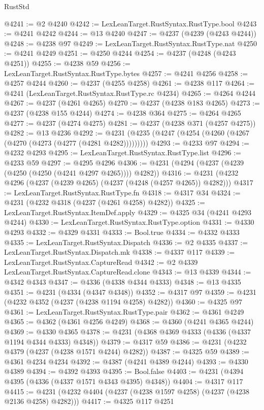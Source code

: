 \begin{lexlean}{RustStd}
\begin{coremodule}
@4241 := @2 @4240
@4242 := LexLeanTarget.RustSyntax.RustType.bool
@4243 := @4241 @4242
@4244 := @13 @4240
@4247 := @4237 (@4239 (@4243 @4244))
@4248 := @4238 @97
@4249 := LexLeanTarget.RustSyntax.RustType.nat
@4250 := @4241 @4249
@4251 := @4250 @4244
@4254 := @4237 (@4248 (@4243 @4251))
@4255 := @4238 @59
@4256 := LexLeanTarget.RustSyntax.RustType.bytes
@4257 := @4241 @4256
@4258 := @4257 @4244
@4260 := @4237 (@4255 @4258)
@4261 := @4238 @117
@4264 := @4241 (LexLeanTarget.RustSyntax.RustType.rc @4234)
@4265 := @4264 @4244
@4267 := @4237 (@4261 @4265)
@4270 := @4237 (@4238 @183 @4265)
@4273 := @4237 (@4238 @155 @4244)
@4274 := @4238 @364
@4275 := @4264 @4265
@4277 := @4237 (@4274 @4275)
@4281 := @4237 (@4238 @371 (@4257 @4275))
@4282 := @13 @4236
@4292 := @4231 (@4235 (@4247 (@4254 (@4260 (@4267 (@4270 (@4273 (@4277 (@4281 @4282)))))))))
@4293 := @4233 @97
@4294 := @4232 @4293
@4295 := LexLeanTarget.RustSyntax.RustType.list
@4296 := @4233 @59
@4297 := @4295 @4296
@4306 := @4231 (@4294 (@4237 (@4239 (@4250 (@4250 (@4241 @4297 @4265)))) @4282))
@4316 := @4231 (@4232 @4296 (@4237 (@4239 @4265) (@4237 (@4248 (@4257 @4265)) @4282)))
@4317 := LexLeanTarget.RustSyntax.RustType.fn
@4318 := @4317 @34
@4324 := @4231 (@4232 @4318 (@4237 (@4261 @4258) @4282))
@4325 := LexLeanTarget.RustSyntax.ItemDef.apply
@4329 := @4325 @34 (@4241 @4293 @4244)
@4330 := LexLeanTarget.RustSyntax.RustType.option
@4331 := @4330 @4293
@4332 := @4329 @4331
@4333 := Bool.true
@4334 := @4332 @4333
@4335 := LexLeanTarget.RustSyntax.Dispatch
@4336 := @2 @4335
@4337 := LexLeanTarget.RustSyntax.Dispatch.mk
@4338 := @4337 @117
@4339 := LexLeanTarget.RustSyntax.CaptureRead
@4342 := @2 @4339 LexLeanTarget.RustSyntax.CaptureRead.clone
@4343 := @13 @4339
@4344 := @4342 @4343
@4347 := @4336 (@4338 @4344 @4333)
@4348 := @13 @4335
@4351 := @4231 (@4334 (@4347 @4348))
@4352 := @4317 @97
@4359 := @4231 (@4232 @4352 (@4237 (@4238 @1194 @4258) @4282))
@4360 := @4325 @97
@4361 := LexLeanTarget.RustSyntax.RustType.pair
@4362 := @4361 @4249
@4365 := @4362 (@4361 @4256 @4249)
@4368 := @4360 (@4241 @4365 @4244)
@4369 := @4330 @4365
@4378 := @4231 (@4368 @4369 @4333 (@4336 (@4337 @1194 @4344 @4333) @4348))
@4379 := @4317 @59
@4386 := @4231 (@4232 @4379 (@4237 (@4238 @1571 @4244) @4282))
@4387 := @4325 @59
@4389 := @4361 @4234 @4234
@4392 := @4387 (@4241 @4389 @4244)
@4393 := @4330 @4389
@4394 := @4392 @4393
@4395 := Bool.false
@4403 := @4231 (@4394 @4395 (@4336 (@4337 @1571 @4343 @4395) @4348))
@4404 := @4317 @117
@4415 := @4231 (@4232 @4404 (@4237 (@4238 @1597 @4258) (@4237 (@4238 @2136 @4258) @4282)))
@4417 := @4325 @117 @4251

\end{coremodule}
\end{lexlean}
